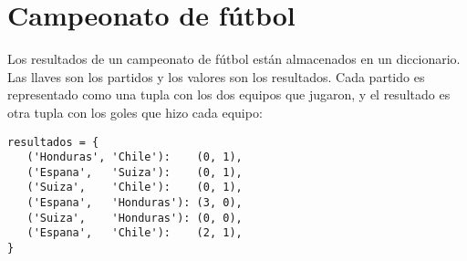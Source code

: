 \section{Campeonato de fútbol}

Los resultados de un campeonato de fútbol están almacenados en un
diccionario. Las llaves son los partidos y los valores son los
resultados. Cada partido es representado como una tupla con los dos
equipos que jugaron, y el resultado es otra tupla con los goles que hizo
cada equipo:

\begin{lstlisting}
resultados = {
   ('Honduras', 'Chile'):    (0, 1),
   ('Espana',   'Suiza'):    (0, 1),
   ('Suiza',    'Chile'):    (0, 1),
   ('Espana',   'Honduras'): (3, 0),
   ('Suiza',    'Honduras'): (0, 0),
   ('Espana',   'Chile'):    (2, 1),
}
\end{lstlisting}


